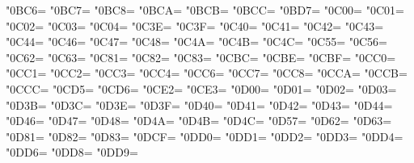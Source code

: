 \XeTeXcharclass"0BC6=\KclassCM
\XeTeXcharclass"0BC7=\KclassCM
\XeTeXcharclass"0BC8=\KclassCM
\XeTeXcharclass"0BCA=\KclassCM
\XeTeXcharclass"0BCB=\KclassCM
\XeTeXcharclass"0BCC=\KclassCM
\XeTeXcharclass"0BD7=\KclassCM
\XeTeXcharclass"0C00=\KclassCM
\XeTeXcharclass"0C01=\KclassCM
\XeTeXcharclass"0C02=\KclassCM
\XeTeXcharclass"0C03=\KclassCM
\XeTeXcharclass"0C04=\KclassCM
\XeTeXcharclass"0C3E=\KclassCM
\XeTeXcharclass"0C3F=\KclassCM
\XeTeXcharclass"0C40=\KclassCM
\XeTeXcharclass"0C41=\KclassCM
\XeTeXcharclass"0C42=\KclassCM
\XeTeXcharclass"0C43=\KclassCM
\XeTeXcharclass"0C44=\KclassCM
\XeTeXcharclass"0C46=\KclassCM
\XeTeXcharclass"0C47=\KclassCM
\XeTeXcharclass"0C48=\KclassCM
\XeTeXcharclass"0C4A=\KclassCM
\XeTeXcharclass"0C4B=\KclassCM
\XeTeXcharclass"0C4C=\KclassCM
\XeTeXcharclass"0C55=\KclassCM
\XeTeXcharclass"0C56=\KclassCM
\XeTeXcharclass"0C62=\KclassCM
\XeTeXcharclass"0C63=\KclassCM
\XeTeXcharclass"0C81=\KclassCM
\XeTeXcharclass"0C82=\KclassCM
\XeTeXcharclass"0C83=\KclassCM
\XeTeXcharclass"0CBC=\KclassCM
\XeTeXcharclass"0CBE=\KclassCM
\XeTeXcharclass"0CBF=\KclassCM
\XeTeXcharclass"0CC0=\KclassCM
\XeTeXcharclass"0CC1=\KclassCM
\XeTeXcharclass"0CC2=\KclassCM
\XeTeXcharclass"0CC3=\KclassCM
\XeTeXcharclass"0CC4=\KclassCM
\XeTeXcharclass"0CC6=\KclassCM
\XeTeXcharclass"0CC7=\KclassCM
\XeTeXcharclass"0CC8=\KclassCM
\XeTeXcharclass"0CCA=\KclassCM
\XeTeXcharclass"0CCB=\KclassCM
\XeTeXcharclass"0CCC=\KclassCM
\XeTeXcharclass"0CD5=\KclassCM
\XeTeXcharclass"0CD6=\KclassCM
\XeTeXcharclass"0CE2=\KclassCM
\XeTeXcharclass"0CE3=\KclassCM
\XeTeXcharclass"0D00=\KclassCM
\XeTeXcharclass"0D01=\KclassCM
\XeTeXcharclass"0D02=\KclassCM
\XeTeXcharclass"0D03=\KclassCM
\XeTeXcharclass"0D3B=\KclassCM
\XeTeXcharclass"0D3C=\KclassCM
\XeTeXcharclass"0D3E=\KclassCM
\XeTeXcharclass"0D3F=\KclassCM
\XeTeXcharclass"0D40=\KclassCM
\XeTeXcharclass"0D41=\KclassCM
\XeTeXcharclass"0D42=\KclassCM
\XeTeXcharclass"0D43=\KclassCM
\XeTeXcharclass"0D44=\KclassCM
\XeTeXcharclass"0D46=\KclassCM
\XeTeXcharclass"0D47=\KclassCM
\XeTeXcharclass"0D48=\KclassCM
\XeTeXcharclass"0D4A=\KclassCM
\XeTeXcharclass"0D4B=\KclassCM
\XeTeXcharclass"0D4C=\KclassCM
\XeTeXcharclass"0D57=\KclassCM
\XeTeXcharclass"0D62=\KclassCM
\XeTeXcharclass"0D63=\KclassCM
\XeTeXcharclass"0D81=\KclassCM
\XeTeXcharclass"0D82=\KclassCM
\XeTeXcharclass"0D83=\KclassCM
\XeTeXcharclass"0DCF=\KclassCM
\XeTeXcharclass"0DD0=\KclassCM
\XeTeXcharclass"0DD1=\KclassCM
\XeTeXcharclass"0DD2=\KclassCM
\XeTeXcharclass"0DD3=\KclassCM
\XeTeXcharclass"0DD4=\KclassCM
\XeTeXcharclass"0DD6=\KclassCM
\XeTeXcharclass"0DD8=\KclassCM
\XeTeXcharclass"0DD9=\KclassCM
